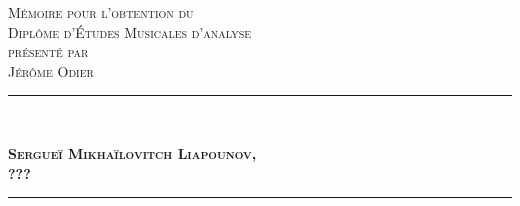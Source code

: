 \begin{titlepage}
\begin{bigcenter}

\vspace*{3.5cm}


\textsc{\large Mémoire pour l'obtention du}\\[0.2cm]
\textsc{\Large Diplôme d'Études Musicales d'analyse}\\[0.2cm]
\textsc{\large présenté par}\\[0.2cm]
\textsc{\Large Jérôme Odier}


\vspace{2.5cm}


\begin{minipage}{1.0\linewidth}
  \rule{\linewidth}{0.5mm}\\
  \begin{bigcenter}
    \textsc{\bfseries\huge Sergueï Mikhaïlovitch Liapounov,}\\[0.5cm]
    \textsc{\bfseries\huge ???}\\[0.5cm]
  \end{bigcenter}
  \rule{\linewidth}{0.5mm}\\
\end{minipage}


\end{bigcenter}
\end{titlepage}

